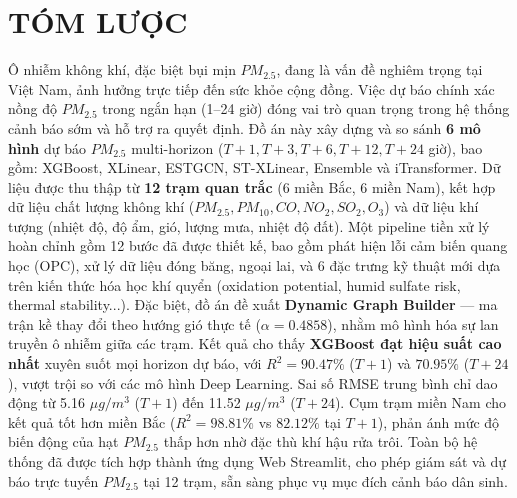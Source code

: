 \chapter*{TÓM LƯỢC}

Ô nhiễm không khí, đặc biệt bụi mịn $PM_{2.5}$, đang là vấn đề nghiêm trọng tại Việt Nam, ảnh hưởng trực tiếp đến sức khỏe cộng đồng. Việc dự báo chính xác nồng độ $PM_{2.5}$ trong ngắn hạn (1–24 giờ) đóng vai trò quan trọng trong hệ thống cảnh báo sớm và hỗ trợ ra quyết định. Đồ án này xây dựng và so sánh \textbf{6 mô hình} dự báo $PM_{2.5}$ multi-horizon ($T+1, T+3, T+6, T+12, T+24$ giờ), bao gồm: XGBoost, XLinear, ESTGCN, ST-XLinear, Ensemble và iTransformer. Dữ liệu được thu thập từ \textbf{12 trạm quan trắc} (6 miền Bắc, 6 miền Nam), kết hợp dữ liệu chất lượng không khí ($PM_{2.5}, PM_{10}, CO, NO_2, SO_2, O_3$) và dữ liệu khí tượng (nhiệt độ, độ ẩm, gió, lượng mưa, nhiệt độ đất). Một pipeline tiền xử lý hoàn chỉnh gồm 12 bước đã được thiết kế, bao gồm phát hiện lỗi cảm biến quang học (OPC), xử lý dữ liệu đóng băng, ngoại lai, và 6 đặc trưng kỹ thuật mới dựa trên kiến thức hóa học khí quyển (oxidation potential, humid sulfate risk, thermal stability...). Đặc biệt, đồ án đề xuất \textbf{Dynamic Graph Builder} — ma trận kề thay đổi theo hướng gió thực tế ($\alpha = 0.4858$), nhằm mô hình hóa sự lan truyền ô nhiễm giữa các trạm. Kết quả cho thấy \textbf{XGBoost đạt hiệu suất cao nhất} xuyên suốt mọi horizon dự báo, với $R^2 = 90.47\%$ ($T+1$) và $70.95\%$ ($T+24$), vượt trội so với các mô hình Deep Learning. Sai số RMSE trung bình chỉ dao động từ 5.16 $\mu g/m^3$ ($T+1$) đến 11.52 $\mu g/m^3$ ($T+24$). Cụm trạm miền Nam cho kết quả tốt hơn miền Bắc ($R^2 = 98.81\%$ vs $82.12\%$ tại $T+1$), phản ánh mức độ biến động của hạt $PM_{2.5}$ thấp hơn nhờ đặc thù khí hậu rửa trôi. Toàn bộ hệ thống đã được tích hợp thành ứng dụng Web Streamlit, cho phép giám sát và dự báo trực tuyến $PM_{2.5}$ tại 12 trạm, sẵn sàng phục vụ mục đích cảnh báo dân sinh.